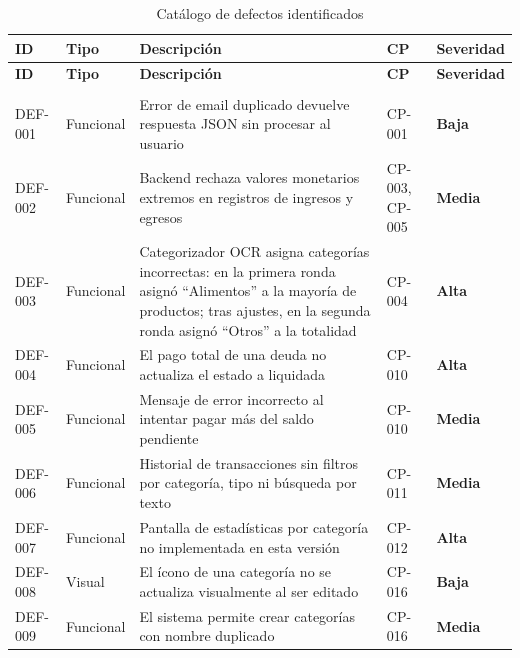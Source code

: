 \begin{longtable}{>{\small}p{1.3cm} >{\small}p{1.9cm} >{\small}p{6.6cm} >{\small}p{1.5cm} >{\small}p{2.4cm}}
  \caption{Catálogo de defectos identificados}
  \label{tab:defectos} \\
  \toprule
  \textbf{ID} & \textbf{Tipo} & \textbf{Descripción} & \textbf{CP} & \textbf{Severidad} \\
  \midrule
  \endfirsthead
  \toprule
  \textbf{ID} & \textbf{Tipo} & \textbf{Descripción} & \textbf{CP} & \textbf{Severidad} \\
  \midrule
  \endhead
  \midrule
  \multicolumn{5}{r}{\footnotesize\textit{(Continúa en la siguiente página)}} \\
  \endfoot
  \bottomrule
  \endlastfoot
  DEF-001 & Funcional & Error de email duplicado devuelve respuesta JSON sin procesar al usuario        & CP-001          & \textcolor{OliveGreen}{\textbf{Baja}}   \\[4pt]
  DEF-002 & Funcional & Backend rechaza valores monetarios extremos en registros de ingresos y egresos  & CP-003, CP-005  & \textcolor{BurntOrange}{\textbf{Media}} \\[4pt]
  DEF-003 & Funcional & Categorizador OCR asigna categorías incorrectas: en la primera ronda asignó ``Alimentos'' a la mayoría de productos; tras ajustes, en la segunda ronda asignó ``Otros'' a la totalidad & CP-004 & \textcolor{BrickRed}{\textbf{Alta}}     \\[4pt]
  DEF-004 & Funcional & El pago total de una deuda no actualiza el estado a liquidada                   & CP-010          & \textcolor{BrickRed}{\textbf{Alta}}     \\[4pt]
  DEF-005 & Funcional & Mensaje de error incorrecto al intentar pagar más del saldo pendiente          & CP-010          & \textcolor{BurntOrange}{\textbf{Media}} \\[4pt]
  DEF-006 & Funcional & Historial de transacciones sin filtros por categoría, tipo ni búsqueda por texto & CP-011         & \textcolor{BurntOrange}{\textbf{Media}} \\[4pt]
  DEF-007 & Funcional & Pantalla de estadísticas por categoría no implementada en esta versión         & CP-012          & \textcolor{BrickRed}{\textbf{Alta}}     \\[4pt]
  DEF-008 & Visual    & El ícono de una categoría no se actualiza visualmente al ser editado           & CP-016          & \textcolor{OliveGreen}{\textbf{Baja}}   \\[4pt]
  DEF-009 & Funcional & El sistema permite crear categorías con nombre duplicado                       & CP-016          & \textcolor{BurntOrange}{\textbf{Media}} \\[4pt]

\end{longtable}
